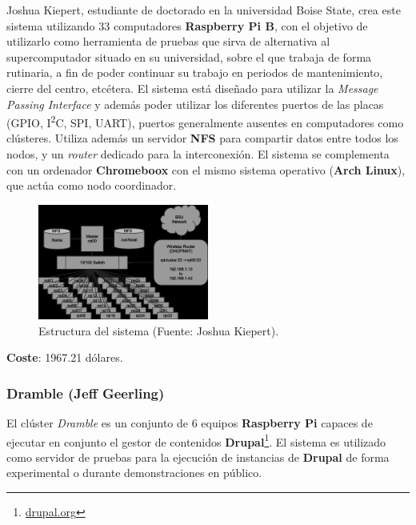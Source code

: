 Joshua Kiepert, estudiante de doctorado en la universidad Boise State, crea este sistema utilizando 33 computadores \textbf{Raspberry Pi B}, con el objetivo de utilizarlo como herramienta de pruebas que sirva de alternativa al supercomputador situado en su universidad\cite{joshuarpicluster}, sobre el que trabaja de forma rutinaria, a fin de poder continuar su trabajo en periodos de mantenimiento, cierre del centro, etcétera. El sistema está diseñado para utilizar la \textit{Message Passing Interface} y además poder utilizar los diferentes puertos de las placas (GPIO, I\textsuperscript{2}C, SPI, UART), puertos generalmente ausentes en computadores como clústeres. Utiliza además un servidor \textbf{NFS} para compartir datos entre todos los nodos, y un \textit{router} dedicado para la interconexión. El sistema se complementa con un ordenador \textbf{Chromeboox} con el mismo sistema operativo (\textbf{Arch Linux}), que actúa como nodo coordinador.


\begin{figure}[H]
\centering
\includegraphics[width=0.5\textwidth]{Chapter1/Figures/structure.png}
\caption{Estructura del sistema (Fuente: Joshua Kiepert).}
\label{kiepert:structure}
\end{figure}

\textbf{Coste}: 1967.21 dólares.


\subsubsection{Dramble (Jeff Geerling)}

El clúster \textit{Dramble} es un conjunto de 6 equipos \textbf{Raspberry Pi} capaces de ejecutar en conjunto el gestor de contenidos \textbf{Drupal}\footnote{\href{https://www.drupal.org/}{drupal.org}}. El sistema es utilizado como servidor de pruebas para la ejecución de instancias de \textbf{Drupal} de forma experimental o durante demonstraciones en público\cite{geerlingraspberry}.

